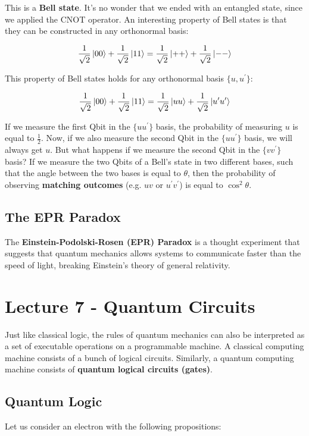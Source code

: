 \documentclass[12pt]{article}
\begin{document}
\noindent
This is a \textbf{Bell state}.
It's no wonder that we ended with an entangled state, since we applied the CNOT operator.
An interesting property of Bell states is that they can be constructed in any orthonormal basis:

\[ \frac{1}{\sqrt{2}}\ket{00} + \frac{1}{\sqrt{2}}\ket{11} = \frac{1}{\sqrt{2}}\ket{++} + \frac{1}{\sqrt{2}}\ket{--} \]

\noindent
This property of Bell states holds for any orthonormal basis $\{ u, u^\prime \}$:

\[ \frac{1}{\sqrt{2}}\ket{00} + \frac{1}{\sqrt{2}}\ket{11} = \frac{1}{\sqrt{2}}\ket{uu} + \frac{1}{\sqrt{2}}\ket{u^\prime u^\prime} \]

\noindent
If we measure the first Qbit in the $\{ u u^\prime \}$ basis, the probability of measuring $u$ is equal to $\frac{1}{2}$.
Now, if we also measure the second Qbit in the $\{ u u^\prime \}$ basis, we will always get $u$.
But what happens if we measure the second Qbit in the $\{ v v^\prime \}$ basis?
If we measure the two Qbits of a Bell's state in two different bases, such that the angle between the two bases is equal to $\theta$, then the probability of observing \textbf{matching outcomes} (e.g. $uv$ or $u^\prime v^\prime$) is equal to $\cos^2 \theta$.

\subsection*{The EPR Paradox}
The \textbf{Einstein-Podolski-Rosen (EPR) Paradox} is a thought experiment that suggests that quantum mechanics allows systems to communicate faster than the speed of light, breaking Einstein's theory of general relativity.

%
%
\section*{Lecture 7 - Quantum Circuits}
Just like classical logic, the rules of quantum mechanics can also be interpreted as a set of executable operations on a programmable machine.
A classical computing machine consists of a bunch of logical circuits.
Similarly, a quantum computing machine consists of \textbf{quantum logical circuits (gates)}.

\newpage
\subsection*{Quantum Logic}
Let us consider an electron with the following propositions:
\end{document}
